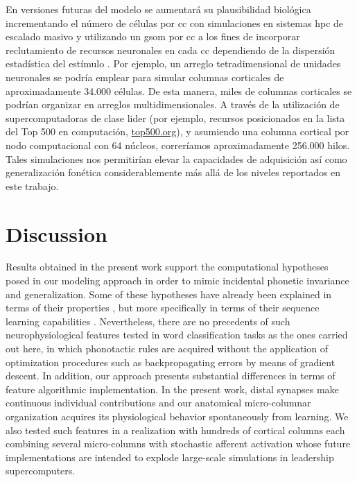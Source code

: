 {En versiones futuras del modelo se aumentará su plausibilidad biológica incrementando el número de células por \gls{cc} con simulaciones en sistemas \gls{hpc} de escalado masivo y utilizando un \gls{gsom} por \gls{cc} a los fines de incorporar reclutamiento de recursos neuronales en cada \gls{cc} dependiendo de la dispersión estadística del estímulo \cite{Meyer19113}. Por ejemplo, un arreglo tetradimensional de unidades neuronales se podría emplear para simular columnas corticales de aproximadamente 34.000 células. De esta manera, miles de columnas corticales se podrían organizar en arreglos multidimensionales. A través de la utilización de supercomputadoras de clase lider (por ejemplo, recursos posicionados en la lista del Top 500 en computación, \url{top500.org}), y asumiendo una columna cortical por nodo computacional con 64 núcleos, correríamos aproximadamente 256.000 hilos. Tales simulaciones nos permitirían elevar la capacidades de adquisición así como generalización fonética considerablemente más allá de los niveles reportados en este trabajo.
}{
\section{Discussion}

Results obtained in the present work support the computational hypotheses posed in our modeling approach in order to mimic incidental phonetic invariance and generalization.
Some of these hypotheses have already been explained in terms of their properties \cite{hawkins_2016}, but more specifically in terms of their sequence learning capabilities \cite{cui_2016}.
Nevertheless, there are no precedents of such neurophysiological features tested in word classification tasks as the ones carried out here, in which phonotactic rules are acquired without the application of optimization procedures such as backpropagating errors by means of gradient descent. In addition, our approach presents substantial differences in terms of feature algorithmic implementation. In the present work, distal synapses make continuous individual contributions and our anatomical micro-columnar organization acquires its physiological behavior spontaneously from learning. We also tested such features in a realization with hundreds of cortical columns each combining several micro-columns with stochastic afferent activation whose future implementations are intended to explode large-scale simulations in leadership supercomputers.

}
